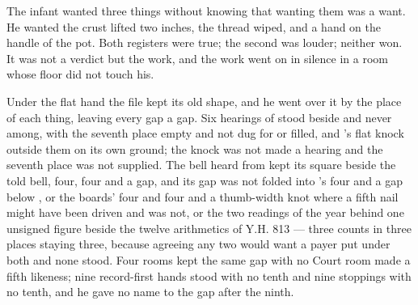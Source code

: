 The infant wanted three things without knowing that wanting them was a want. He wanted the crust lifted two inches, the thread wiped, and a hand on the handle of the pot. Both registers were true; the second was louder; neither won. It was not a verdict but the work, and the work went on in silence in a room whose floor did not touch his.

Under the flat hand the file kept its old shape, and he went over it by the place of each thing, leaving every gap a gap. Six hearings of  stood beside and never among, with the seventh place empty and not dug for or filled, and 's flat knock outside them on its own ground; the knock was not made a hearing and the seventh place was not supplied. The bell heard from  kept its square beside the told bell, four, four and a gap, and its gap was not folded into 's four and a gap below , or the boards' four and four and a thumb-width knot where a fifth nail might have been driven and was not, or the two readings of the year behind one unsigned figure beside the twelve arithmetics of Y.H. 813 --- three counts in three places staying three, because agreeing any two would want a payer put under both and none stood. Four rooms kept the same gap with no Court room made a fifth likeness; nine record-first hands stood with no tenth and nine stoppings with no tenth, and he gave no name to the gap after the ninth.

